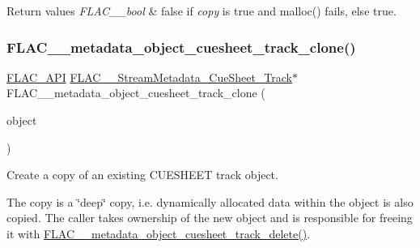 \begin{DoxyRetVals}{Return values}
{\em F\+L\+A\+C\+\_\+\+\_\+bool} & {\ttfamily false} if {\itshape copy} is {\ttfamily true} and malloc() fails, else {\ttfamily true}. \\
\hline
\end{DoxyRetVals}
\mbox{\label{group__flac__metadata__object_gaf085bed12af15034839307ca04286d4f}} 
\subsubsection{\texorpdfstring{F\+L\+A\+C\+\_\+\+\_\+metadata\+\_\+object\+\_\+cuesheet\+\_\+track\+\_\+clone()}{FLAC\_\_metadata\_object\_cuesheet\_track\_clone()}}
{\footnotesize\ttfamily \hyperlink{group__flac__export_ga56ca07df8a23310707732b1c0007d6f5}{F\+L\+A\+C\+\_\+\+A\+PI} \hyperlink{struct_f_l_a_c_____stream_metadata___cue_sheet___track}{F\+L\+A\+C\+\_\+\+\_\+\+Stream\+Metadata\+\_\+\+Cue\+Sheet\+\_\+\+Track}$\ast$ F\+L\+A\+C\+\_\+\+\_\+metadata\+\_\+object\+\_\+cuesheet\+\_\+track\+\_\+clone (\begin{DoxyParamCaption}\item[{\hyperlink{zconf_8h_a2c212835823e3c54a8ab6d95c652660e}{const} \hyperlink{struct_f_l_a_c_____stream_metadata___cue_sheet___track}{F\+L\+A\+C\+\_\+\+\_\+\+Stream\+Metadata\+\_\+\+Cue\+Sheet\+\_\+\+Track} $\ast$}]{object }\end{DoxyParamCaption})}

Create a copy of an existing C\+U\+E\+S\+H\+E\+ET track object.

The copy is a \char`\"{}deep\char`\"{} copy, i.\+e. dynamically allocated data within the object is also copied. The caller takes ownership of the new object and is responsible for freeing it with \hyperlink{group__flac__metadata__object_ga8fbf8912add405a4b1acd510b6e27c89}{F\+L\+A\+C\+\_\+\+\_\+metadata\+\_\+object\+\_\+cuesheet\+\_\+track\+\_\+delete()}.


